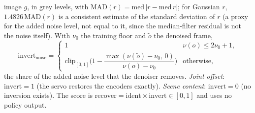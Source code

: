\documentclass{article}
\newcommand{\ident}{\mathrm{ident}}
\newcommand{\invert}{\mathrm{invert}}
\newcommand{\recover}{\mathrm{recover}}
\begin{document}
image $g$, in grey levels, with $\mathrm{MAD}(r) = \mathrm{med}\,|r - \mathrm{med}\,r|$; for Gaussian $r$,
$1.4826\,\mathrm{MAD}(r)$ is a consistent estimate of the standard deviation of $r$ (a proxy for the added
noise level, not equal to it, since the median-filter residual is not the noise itself). With $\nu_0$ the training floor and
$\tilde o$ the denoised frame,
\begin{equation}
\invert_{\mathrm{noise}} =
\begin{cases} 1 & \nu(o) \le 2\nu_0 + 1, \\[2pt]
\mathrm{clip}_{[0,1]}\!\Big(1 - \dfrac{\max(\nu(\tilde o) - \nu_0,\, 0)}{\nu(o) - \nu_0}\Big) & \text{otherwise,}
\end{cases}
\end{equation}
the share of the added noise level that the denoiser removes. \emph{Joint offset}: $\invert = 1$ (the servo restores
the encoders exactly). \emph{Scene content}: $\invert = 0$ (no inversion exists). The score is
$\recover = \ident \times \invert \in [0,1]$ and uses no policy output.
\end{document}
